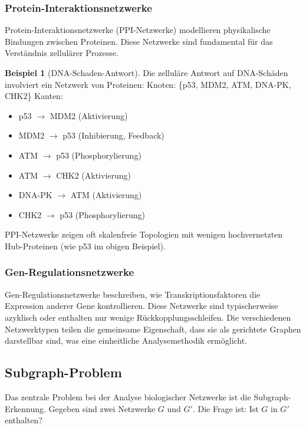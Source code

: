 ﻿\documentclass[a4paper,12pt]{article}
\theoremstyle{definition}
\newtheorem{beispiel}{Beispiel}
\begin{document}
\subsubsection{Protein-Interaktionsnetzwerke}

Protein-Interaktionsnetzwerke (PPI-Netzwerke) modellieren physikalische Bindungen zwischen Proteinen. Diese Netzwerke sind fundamental für das Verständnis zellulärer Prozesse.

\begin{beispiel}[DNA-Schaden-Antwort]
	Die zelluläre Antwort auf DNA-Schäden involviert ein Netzwerk von Proteinen:\newline
	Knoten: \{p53, MDM2, ATM, DNA-PK, CHK2\}\newline
	Kanten: 
	\begin{itemize}
		\item[-] p53 $\rightarrow$ MDM2 (Aktivierung)
		\item[-] MDM2 $\rightarrow$ p53 (Inhibierung, Feedback)
		\item[-] ATM $\rightarrow$ p53 (Phosphorylierung)
		\item[-] ATM $\rightarrow$ CHK2 (Aktivierung)
		\item[-] DNA-PK $\rightarrow$ ATM (Aktivierung)
		\item[-] CHK2 $\rightarrow$ p53 (Phosphorylierung)
	\end{itemize}
\end{beispiel}

PPI-Netzwerke zeigen oft skalenfreie Topologien mit wenigen hochvernetzten Hub-Proteinen (wie p53 im obigen Beispiel).

\subsubsection{Gen-Regulationsnetzwerke}

Gen-Regulationsnetzwerke beschreiben, wie Transkriptionsfaktoren die Expression anderer Gene kontrollieren. Diese Netzwerke sind typischerweise azyklisch oder enthalten nur wenige Rückkopplungsschleifen. Die verschiedenen Netzwerktypen teilen die gemeinsame Eigenschaft, dass sie als gerichtete Graphen darstellbar sind, was eine einheitliche Analysemethodik ermöglicht.

\subsection{Subgraph-Problem}

Das zentrale Problem bei der Analyse biologischer Netzwerke ist die Subgraph-Erkennung. Gegeben sind zwei Netzwerke $G$ und $G'$. Die Frage ist: Ist $G$ in $G'$ enthalten?
\end{document}
